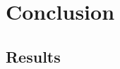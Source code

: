 \section{Conclusion}

\newcommand\ah[2]{\tikz[remember picture,baseline]\node[inner sep=2pt,outer sep=0](#1){#2};}
\newcommand\arrow[2]{%
  \begin{tikzpicture}[remember picture, overlay, >=stealth, shift={(0,0)}]
    \draw[->] (#1) to (#2);
  \end{tikzpicture}%
}

\subsection{Results}
